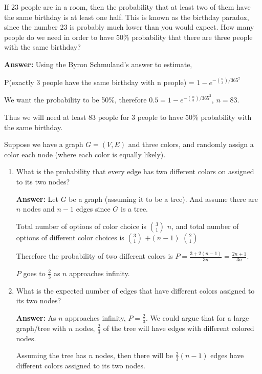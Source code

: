 \documentclass{article}
\author{Group 13: Elliott Pryor, Ben Bushnell, Shengnan Zhou}
\date{due: 18 October 2019}
\begin{document}
\nextprob
If 23 people are in a room, then the probability that at least two of them have
the same birthday is at least one half.  This is known as the birthday paradox,
since the number 23 is probably much lower than you would expect.  How many
people do we need in order to have 50\% probability that there are three people
with the same birthday?


\textbf{Answer: }  Using the Byron Schmuland's answer to estimate,

P(exactly 3 people have the same birthday with n people) = $1 - e^{-{n\choose 3}/365^2}$

We want the probability to be 50\%, therefore $0.5 = 1 - e^{-{n\choose 3}/365^2}$, $n = 83$.

Thus we will need at least 83 people for 3 people to have 50\% probability with the same birthday.


\nextprob
Suppose we have a graph $G=(V,E)$ and three colors, and randomly assign a color
each node (where each color is equally likely).
\begin{enumerate}
   \item What is the probability that every edge has two different colors on
        assigned to its two nodes?
        
        \textbf{Answer:} Let $G$ be a graph (assuming it to be a tree). And assume there are $n$ nodes and $n-1$ edges since $G$ is a tree.
        
        Total number of options of color choice is $3\choose 1$ $n$, and total number of options of different color choices is $3\choose 1$ $+ (n-1) $ $2\choose 1$
        
        Therefore the probability of two different colors is $P = \frac{3+2(n-1)}{3n} = \frac{2n+1}{3n}$.
        
        $P$ goes to $\frac{2}{3}$ as $n$ approaches infinity.
               
    \item What is the expected number of edges that have different colors
        assigned to its two nodes?
        
        \textbf{Answer:} As $n$ approaches infinity, $P=\frac{2}{3}$. We could argue that for a large graph/tree with $n$ nodes,  $\frac{2}{3}$ of the tree will have edges with different colored nodes. 
        
        Assuming the tree has $n$ nodes, then there will be $\frac{2}{3} (n-1)$ edges have different colors assigned to its two nodes.
        
\end{enumerate}
\end{document}
